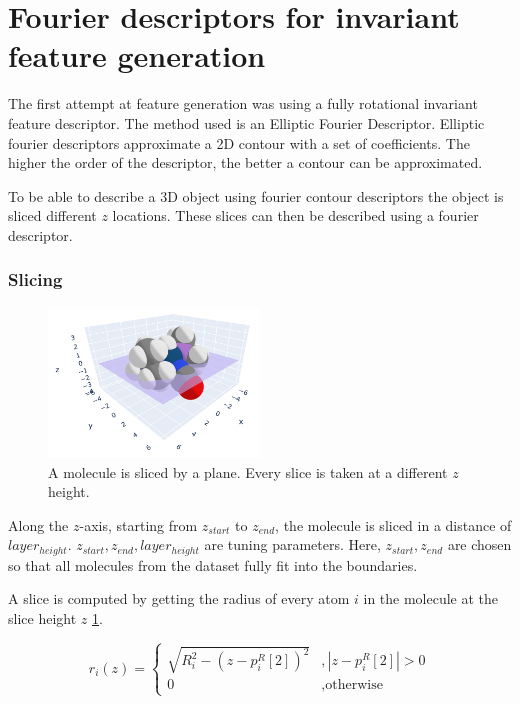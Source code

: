 \section{Fourier descriptors for invariant feature generation}

The first attempt at feature generation was using a fully rotational invariant feature descriptor.
The method used is an Elliptic Fourier Descriptor.
Elliptic fourier descriptors approximate a 2D contour with a set of coefficients.
The higher the order of the descriptor, the better a contour can be approximated.

To be able to describe a 3D object using fourier contour descriptors the object is sliced different $z$ locations.
These slices can then be described using a fourier descriptor.

\subsubsection{Slicing}

\begin{figure} [h]
  \centering
  \includegraphics[width=0.5\textwidth]{figures/fourier/slice3d.png} %
  \caption{A molecule is sliced by a plane. Every slice is taken at a different $z$ height.}
  \label{fig:slice3d}
\end{figure}

Along the $z$-axis, starting from $z_{start}$ to $z_{end}$, the molecule is sliced in a distance of $layer_{height}$.
$z_{start}, z_{end}, layer_{height}$ are tuning parameters.
Here, $z_{start}, z_{end}$ are chosen so that all molecules from the dataset fully fit into the boundaries.

A slice is computed by getting the radius of every atom $i$ in the molecule at the slice height $z$ \ref{fig:slice3d}.

$$ r_i(z) =\left\{\begin{array}{ll} \sqrt{R_i^2 - (z - p_i^R[2])^2} &, | z - p_i^R[2] |  > 0\\
  0 &, \text{otherwise}\end{array}\right.
$$

